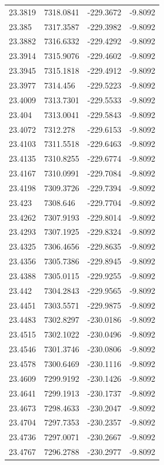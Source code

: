 \begin{table}[H]
\begin{tabular}{llll}
23.3819 & 7318.0841 & -229.3672 & -9.8092 \\
23.385 & 7317.3587 & -229.3982 & -9.8092 \\
23.3882 & 7316.6332 & -229.4292 & -9.8092 \\
23.3914 & 7315.9076 & -229.4602 & -9.8092 \\
23.3945 & 7315.1818 & -229.4912 & -9.8092 \\
23.3977 & 7314.456 & -229.5223 & -9.8092 \\
23.4009 & 7313.7301 & -229.5533 & -9.8092 \\
23.404 & 7313.0041 & -229.5843 & -9.8092 \\
23.4072 & 7312.278 & -229.6153 & -9.8092 \\
23.4103 & 7311.5518 & -229.6463 & -9.8092 \\
23.4135 & 7310.8255 & -229.6774 & -9.8092 \\
23.4167 & 7310.0991 & -229.7084 & -9.8092 \\
23.4198 & 7309.3726 & -229.7394 & -9.8092 \\
23.423 & 7308.646 & -229.7704 & -9.8092 \\
23.4262 & 7307.9193 & -229.8014 & -9.8092 \\
23.4293 & 7307.1925 & -229.8324 & -9.8092 \\
23.4325 & 7306.4656 & -229.8635 & -9.8092 \\
23.4356 & 7305.7386 & -229.8945 & -9.8092 \\
23.4388 & 7305.0115 & -229.9255 & -9.8092 \\
23.442 & 7304.2843 & -229.9565 & -9.8092 \\
23.4451 & 7303.5571 & -229.9875 & -9.8092 \\
23.4483 & 7302.8297 & -230.0186 & -9.8092 \\
23.4515 & 7302.1022 & -230.0496 & -9.8092 \\
23.4546 & 7301.3746 & -230.0806 & -9.8092 \\
23.4578 & 7300.6469 & -230.1116 & -9.8092 \\
23.4609 & 7299.9192 & -230.1426 & -9.8092 \\
23.4641 & 7299.1913 & -230.1737 & -9.8092 \\
23.4673 & 7298.4633 & -230.2047 & -9.8092 \\
23.4704 & 7297.7353 & -230.2357 & -9.8092 \\
23.4736 & 7297.0071 & -230.2667 & -9.8092 \\
23.4767 & 7296.2788 & -230.2977 & -9.8092 \\

\end{tabular}
\end{table}
